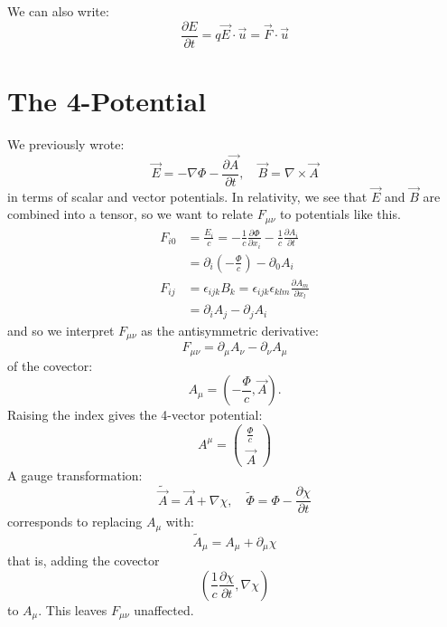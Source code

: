 \documentclass[../Main.tex]{subfiles}
\begin{document}
We can also write:
\begin{equation*}
    \frac{\partial E}{\partial t} = q \vec{E} \cdot \vec{u} = \vec{F} \cdot \vec{u}
\end{equation*}
\section{The 4-Potential}
We previously wrote:
\begin{equation*}
    \vec{E} = -\nabla \Phi - \frac{\partial \vec{A}}{\partial t},\quad \vec{B} = \nabla \times \vec{A}
\end{equation*}
in terms of scalar and vector potentials. In relativity, we see that $\vec{E}$ and $\vec{B}$ are combined into a tensor, so we want to relate $F_{\mu \nu}$ to potentials like this.
\begin{align*}
    F_{i0} &= \frac{E_i}{c} = -\frac1c \frac{\partial \Phi}{\partial x_i} - \frac1c \frac{\partial A_i}{\partial t} \\
    &= \partial_i \left(-\frac{\Phi}{c}\right) - \partial_0 A_i \\
    F_{ij} &= \epsilon_{ijk} B_k = \epsilon_{ijk} \epsilon_{klm} \frac{\partial A_m}{\partial x_l} \\
    &= \partial_i A_j - \partial_j A_i
\end{align*}
and so we interpret $F_{\mu \nu}$ as the antisymmetric derivative:
\begin{equation}
    F_{\mu \nu} = \partial_\mu A_\nu - \partial_\nu A_\mu
    \label{eqnForcePotential}
\end{equation}
of the covector:
\begin{equation*}
    A_\mu = \left(-\frac{\Phi}{c}, \vec{A}\right).
\end{equation*}
Raising the index gives the 4-vector potential:
\begin{equation}
    A^\mu =
    \begin{pmatrix}\frac{\Phi}{c} \\ \vec{A}\end{pmatrix}
    \label{eqnFourPotential}
\end{equation}
A gauge transformation:
\begin{equation*}
    \tilde{\vec{A}} = \vec{A} + \nabla \chi,\quad \tilde{\Phi} = \Phi - \frac{\partial \chi}{\partial t}
\end{equation*}
corresponds to replacing $A_\mu$ with:
\begin{equation*}
    \tilde{A}_{\mu} = A_\mu + \partial_\mu \chi
\end{equation*}
that is, adding the covector
\begin{equation*}
    \left(\frac1c \frac{\partial \chi}{\partial t}, \nabla \chi\right)
\end{equation*}
to $A_\mu$. This leaves $F_{\mu \nu}$ unaffected.
\end{document}
